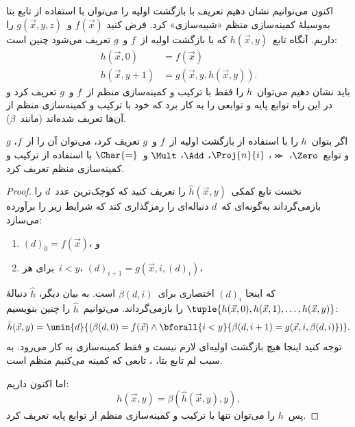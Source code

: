 \documentclass[../../../include/open-logic-section]{subfiles}
\begin{document}

اکنون می‌توانیم نشان دهیم تعریف با بازگشت اولیه را می‌توان با استفاده
از تابع بتا به‌وسیلهٔ کمینه‌سازی منظم «شبیه‌سازی» کرد. فرض کنید
$f(\vec x)$ و~$g(\vec x,y,z)$ را داریم. آنگاه تابع~$h(\vec x,y)$ که
با بازگشت اولیه از~$f$ و~$g$ تعریف می‌شود چنین است:
\begin{align*}
h(\vec x, 0) & =  f(\vec x) \\
h(\vec x, y+1) & =  g(\vec x, y, h(\vec x, y)).
\end{align*}
باید نشان دهیم می‌توان~$h$ را فقط با ترکیب و کمینه‌سازی منظم از~$f$
و~$g$ تعریف کرد و در این راه توابع پایه و توابعی را به کار برد که
خود با ترکیب و کمینه‌سازی منظم از آن‌ها تعریف شده‌اند (مانند~$\beta$).

\begin{lem}
اگر بتوان~$h$ را با استفاده از بازگشت اولیه از~$f$ و~$g$ تعریف کرد،
می‌توان آن را از~$f$، $g$ و توابع~$\Zero$، $\Succ$، $\Proj{n}{i}$،
$\Add$، $\Mult$ و~$\Char{=}$ با استفاده از ترکیب و کمینه‌سازی منظم
تعریف کرد.
\end{lem}

\begin{proof}
نخست تابع کمکی~$\hat h(\vec x,y)$ را تعریف کنید که کوچک‌ترین عدد~$d$
را بازمی‌گرداند به‌گونه‌ای که~$d$ دنباله‌ای را رمزگذاری کند که شرایط
زیر را برآورده می‌سازد:
\begin{enumerate}
\item $(d)_0=f(\vec x)$، و
\item برای هر~$i<y$، $(d)_{i+1}=g(\vec x,i,(d)_i)$،
\end{enumerate}
که اینجا $(d)_i$ اختصاری برای~$\beta(d,i)$ است. به بیان دیگر،
$\hat h$ دنبالهٔ
$\tuple{h(\vec x,0),h(\vec x,1),\dots,h(\vec x,y)}$ را
بازمی‌گرداند. می‌توانیم~$\hat h$ را چنین بنویسیم:
\[
\hat h(\vec x, y) = \umin{d}{(\beta(d,0) = f(\vec x) \land \bforall{i <
  y}{\beta(d,i+1) = g(\vec x, i,\beta(d,i)})}.
\]
توجه کنید اینجا هیچ بازگشت اولیه‌ای لازم نیست و فقط کمینه‌سازی به کار
می‌رود. به سبب لم تابع بتا، ، تابعی که کمینه
می‌کنیم منظم است.

اما اکنون داریم:
\[
h(\vec x, y) = \beta(\hat h(\vec x, y), y),
\]
پس~$h$ را می‌توان تنها با ترکیب و کمینه‌سازی منظم از توابع پایه تعریف
کرد.
\end{proof}
\end{document}
